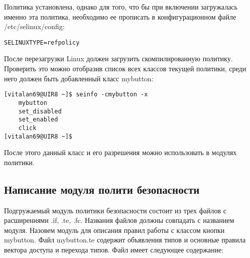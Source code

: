 \documentclass{./../class/UIR}
\begin{document}
	Политика установлена, однако для того, что бы при включении загружалась именно
	эта политика, необходимо ее прописать в конфигурационном файле
	/etc/selinux/config:
\begin{verbatim}
SELINUXTYPE=refpolicy
\end{verbatim}
	После перезагрузки Linux должен загрузить скомпилированную политику. Проверить
	это можно отобразив список всех классов текущей политики, среди него должен
	быть добавленный класс mybutton:
\begin{verbatim}
[vitalan69@UIR8 ~]$ seinfo -cmybutton -x
    mybutton
    set_disabled
    set_enabled
    click
[vitalan69@UIR8 ~]$
\end{verbatim}
	После этого данный класс и его разрешения можно использовать в модулях
	политики.
	
\subsection{Написание модуля полити безопасности}
	Подгружаемый модуль политики безопасности состоит из трех файлов с
	расширениями .if, .te, .fc. Названия файлов должны совпадать с названием
	модуля. Назовем модуль для описания правил работы с классом кнопки	mybutton.
	Файл mybutton.te содержит объявления типов и основные правила вектора доступа и
	перехода типов. Файл имеет следующее содержание:
\end{document}
